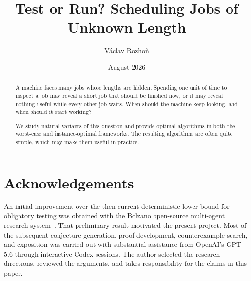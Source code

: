 \documentclass[11pt]{article}
\title{Test or Run? Scheduling Jobs of Unknown Length}
\author{Václav Rozhoň}
\date{August 2026}
\theoremstyle{definition}
\theoremstyle{remark}
\begin{document}
\maketitle

\begin{abstract}
A machine faces many jobs whose lengths are hidden.  Spending one unit of
time to inspect a job may reveal a short job that should be finished now, or
it may reveal nothing useful while every other job waits.  When should the
machine keep looking, and when should it start working?

We study natural variants of this question and provide optimal algorithms in
both the worst-case and instance-optimal frameworks. The resulting algorithms
are often quite simple, which may make them useful in practice.
\end{abstract}

\tableofcontents
\clearpage




















\section*{Acknowledgements}

An initial improvement over the then-current deterministic lower bound for
obligatory testing was obtained with the Bolzano open-source multi-agent
research system~\cite{GrebikEtAl2026Bolzano}.  That preliminary result
motivated the present project.  Most of the subsequent conjecture generation,
proof development, counterexample search, and exposition was carried out with
substantial assistance from OpenAI's GPT-5.6 through
interactive Codex sessions.  The author selected the research directions,
reviewed the arguments, and takes responsibility for the claims
in this paper.



\end{document}
